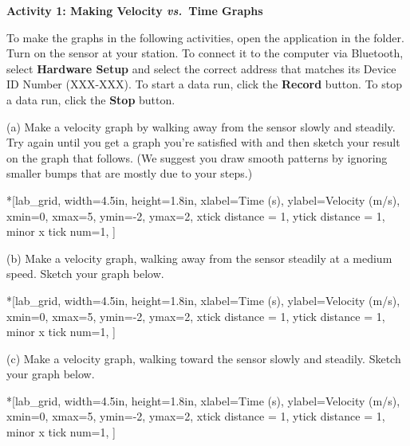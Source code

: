 \bigskip

\textbf{Activity 1: Making Velocity \textit{vs.}~Time Graphs} 

To make the graphs in the following activities, open the  application in the \filename{\coursefolder} folder. Turn on the sensor at your station. To connect it to the computer via Bluetooth, select \textbf{Hardware Setup} and select the correct address that matches its Device ID Number (XXX-XXX). To start a data run, click the \textbf{Record} button. To stop a data run, click the \textbf{Stop} button.

(a) Make a velocity graph by walking away from the sensor slowly and steadily.
Try again until you get a graph you're satisfied with and then sketch your result
on the graph that follows. (We suggest you draw smooth patterns by ignoring
smaller bumps that are mostly due to your steps.)

\begin{lab_axis}*[lab_grid,
	width=4.5in, height=1.8in,
	xlabel={Time (s)},
	ylabel={Velocity (m/s)},
	xmin=0, xmax=5,
	ymin=-2, ymax=2,
	xtick distance = 1,
	ytick distance = 1,
	minor x tick num=1,
	]
\end{lab_axis}

(b) Make a velocity graph, walking away from the sensor steadily at a medium
speed. Sketch your graph below.

\begin{lab_axis}*[lab_grid,
	width=4.5in, height=1.8in,
	xlabel={Time (s)},
	ylabel={Velocity (m/s)},
	xmin=0, xmax=5,
	ymin=-2, ymax=2,
	xtick distance = 1,
	ytick distance = 1,
	minor x tick num=1,
	]
\end{lab_axis}

(c) Make a velocity graph, walking toward the sensor slowly and steadily.
Sketch your graph below.

\begin{lab_axis}*[lab_grid,
	width=4.5in, height=1.8in,
	xlabel={Time (s)},
	ylabel={Velocity (m/s)},
	xmin=0, xmax=5,
	ymin=-2, ymax=2,
	xtick distance = 1,
	ytick distance = 1,
	minor x tick num=1,
	]
\end{lab_axis}

